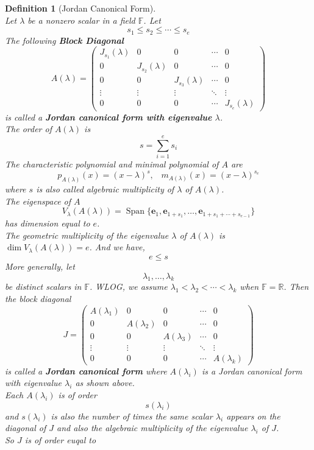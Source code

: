 \documentclass[12pt]{article}
\newtheorem{definition}{Definition}[section]
\theoremstyle{definition}
\DeclareMathOperator{\spn}{Span}
\begin{document}
\begin{definition}[Jordan Canonical Form]
\hfill\\\normalfont Let $\lambda$ be a nonzero scalar in a field $\mathbb{F}$. Let
\[
s_1\leq s_2\leq \cdots\leq s_e
\]
The following \textbf{Block Diagonal}
\[
A(\lambda)=\begin{pmatrix}
J_{s_1}(\lambda)&0&0&\cdots&0\\
0&J_{s_2}(\lambda)&0&\cdots&0\\
0&0&J_{s_3}(\lambda)&\cdots&0\\
\vdots&\vdots&\vdots&\ddots&\vdots\\
0&0&0&\cdots&J_{s_e}(\lambda)
\end{pmatrix}
\]
is called a \textbf{Jordan canonical form with eigenvalue} $\lambda$.\\
The order of $A(\lambda)$ is 
\[
s=\sum_{i=1}^e s_i
\]
The characteristic polynomial and minimal polynomial of $A$ are
\[
p_{A(\lambda)}(x)=(x-\lambda)^s,\;\;\; m_{A(\lambda)}(x)=(x-\lambda)^{s_e}
\]
where $s$ is also called algebraic multiplicity of $\lambda$ of $A(\lambda)$.\\
The eigenspace of $A$
\[
V_\lambda(A(\lambda)) = \spn\{\mathbf{e}_1,\mathbf{e}_{1+s_1},\ldots,\mathbf{e}_{1+s_1+\cdots+s_{e-1}}\}
\]
has dimension equal to $e$.\\
The geometric multiplicity of the eigenvalue $\lambda$ of $A(\lambda)$ is $\dim V_\lambda(A(\lambda)) = e$. And we have,
\[
e\leq s
\]
More generally, let 
\[
\lambda_1,\ldots,\lambda_k
\]
be distinct scalars in $\mathbb{F}$. WLOG, we assume $\lambda_1<\lambda_2<\cdots<\lambda_k$ when $\mathbb{F}=\mathbb{R}$. Then the block diagonal
\[
J=\begin{pmatrix}
A(\lambda_1)&0&0&\cdots&0\\
0&A(\lambda_2)&0&\cdots&0\\
0&0&A(\lambda_3)&\cdots&0\\
\vdots&\vdots&\vdots&\ddots&\vdots\\
0&0&0&\cdots&A(\lambda_k)
\end{pmatrix}
\]
is called a \textbf{Jordan canonical form} where $A(\lambda_i)$ is a Jordan canonical form with eigenvalue $\lambda_i$ as shown above.\\
Each $A(\lambda_i)$ is of order 
\[
s(\lambda_i)
\]
and $s(\lambda_i)$ is also the number of times the same scalar $\lambda_i$ appears on the diagonal of $J$ and also the algebraic multiplicity of the eigenvalue $\lambda_i$ of $J$.\\
So $J$ is of order euqal to 

\end{definition}
\end{document}
